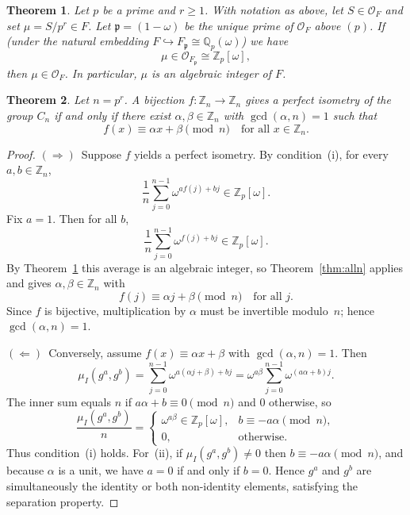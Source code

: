 \documentclass[10pt,a4paper]{amsart}
\newtheorem{thm}{Theorem}
\begin{document}
\begin{thm}\label{thm:local-global}
	Let $p$ be a prime and $r\ge 1$. With notation as above, let $S\in \mathcal{O}_F$ and set $\mu=S/p^r\in F$.
	Let $\mathfrak{p}=(1-\omega)$ be the unique prime of $\mathcal{O}_F$ above $(p)$. If (under the natural embedding
	$F\hookrightarrow F_{\mathfrak{p}}\cong \mathbb{Q}_p(\omega)$) we have
	\[
		\mu\in \mathcal{O}_{F_{\mathfrak{p}}}\cong \mathbb{Z}_p[\omega],
	\]
	then $\mu\in \mathcal{O}_F$. In particular, $\mu$ is an algebraic integer of $F$.
\end{thm}

\begin{thm}\label{thm:perfect}
	Let $n=p^r$.  A bijection $f : \mathbb{Z}_n \to \mathbb{Z}_n$ gives a perfect
	isometry of the group $C_n$ if and only if there exist $\alpha,\beta \in \mathbb{Z}_n$
	with $\gcd(\alpha,n)=1$ such that
	\[
		f(x) \equiv \alpha x + \beta \pmod n \quad \text{for all } x\in\mathbb{Z}_n.
	\]
\end{thm}

\begin{proof}
	$(\Rightarrow)$\ Suppose $f$ yields a perfect isometry.  By condition~(i),
	for every $a,b\in\mathbb{Z}_n$,
	\[
		\frac{1}{n}\sum_{j=0}^{n-1}\omega^{a f(j)+bj} \in \mathbb{Z}_p[\omega].
	\]
	Fix $a=1$.  Then for all $b$,
	\[
		\frac{1}{n}\sum_{j=0}^{n-1}\omega^{f(j)+bj} \in \mathbb{Z}_p[\omega].
	\]
	By Theorem~\ref{thm:local-global} this average is an algebraic integer, so Theorem~\ref{thm:alln} applies and gives $\alpha,\beta\in\mathbb{Z}_n$ with
	\[
		f(j)\equiv \alpha j + \beta \pmod n \quad\text{for all }j.
	\]
	Since $f$ is bijective, multiplication by $\alpha$ must be invertible modulo~$n$;
	hence $\gcd(\alpha,n)=1$.

	$(\Leftarrow)$\ Conversely, assume $f(x)\equiv \alpha x+\beta$ with
	$\gcd(\alpha,n)=1$.  Then
	\[
		\mu_I(g^a,g^b)
		= \sum_{j=0}^{n-1}\omega^{a(\alpha j+\beta)+bj}
		= \omega^{a\beta}\sum_{j=0}^{n-1}\omega^{(a\alpha+b)j}.
	\]
	The inner sum equals $n$ if $a\alpha+b\equiv0\pmod n$ and $0$ otherwise, so
	\[
		\frac{\mu_I(g^a,g^b)}{n}
		= \begin{cases}
			\omega^{a\beta}\in \mathbb{Z}_p[\omega], & b\equiv -a\alpha \pmod n, \\[4pt]
			0,                                       & \text{otherwise}.
		\end{cases}
	\]
	Thus condition~(i) holds.  For~(ii), if $\mu_I(g^a,g^b)\ne0$ then
	$b\equiv -a\alpha\pmod n$, and because $\alpha$ is a unit, we have
	$a=0$ if and only if $b=0$.  Hence $g^a$ and $g^b$ are simultaneously
	the identity or both non-identity elements, satisfying the separation property.
\end{proof}
\end{document}
